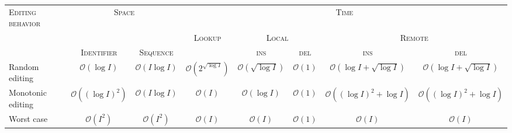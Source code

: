 
\begin{tabular}{@{}lccccccc@{}}
  \toprule
  \textsc{Editing behavior} & \multicolumn{2}{c}{\textsc{Space}} & \multicolumn{5}{c}{\textsc{Time}} \\ \cmidrule{4-8}
  & & & \multirow{2}{*}{\textsc{Lookup}} & \multicolumn{2}{c}{\textsc{Local}} & \multicolumn{2}{c}{\textsc{Remote}} \\ \cmidrule{2-3} \cmidrule{5-8}
  & \textsc{Identifier} & \textsc{Sequence} & & \textsc{ins} & \textsc{del} & \textsc{ins} & \textsc{del}  \\ \midrule
  Random editing & $\mathcal{O}(\log I)$ & $\mathcal{O}(I\log I)$ & $\mathcal{O}(2^{\sqrt{\log I}})$ & $\mathcal{O}(\sqrt{\log I})$ & $\mathcal{O}(1)$ & $\mathcal{O}(\log I + \sqrt{\log I})$ & $\mathcal{O}(\log I + \sqrt{\log I})$ \\
  Monotonic editing & $\mathcal{O}((\log I)^2)$ & $\mathcal{O}(I \log I)$ & $\mathcal{O}(I)$ & $\mathcal{O}(\log I)$ & $\mathcal{O}(1)$ & $\mathcal{O}((\log I)^2 +\log I)$ & $\mathcal{O}((\log I)^2 +\log I)$ \\
  Worst case & $\mathcal{O}(I^2)$ & $\mathcal{O}(I^2)$ & $\mathcal{O}(I)$ & $\mathcal{O}(I)$ & $\mathcal{O}(1)$ & $\mathcal{O}(I)$ & $\mathcal{O}(I)$\\ \bottomrule
\end{tabular}


